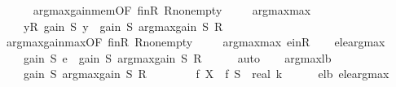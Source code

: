 \begin{isabellebody}
\ \ \ \ \isamarkupfalse%
\ argmax{\isacharunderscore}{\kern0pt}gain{\isacharunderscore}{\kern0pt}mem{\isacharbrackleft}{\kern0pt}OF\ finR\ R{\isacharunderscore}{\kern0pt}nonempty{\isacharprime}{\kern0pt}{\isacharbrackright}{\kern0pt}\ \isakeywordONE{{\isachardot}{\kern0pt}}\isamarkupfalse%
\isanewline
\isanewline
\ \ \isamarkupfalse%
\ argmax{\isacharunderscore}{\kern0pt}max{\isacharcolon}{\kern0pt}\isanewline
\ \ \ \ {\isachardoublequoteopen}{\isasymforall}y{\isasymin}{\isacharquery}{\kern0pt}R{\isachardot}{\kern0pt}\ gain\ {\isacharquery}{\kern0pt}S\ y\ {\isasymle}\ gain\ {\isacharquery}{\kern0pt}S\ {\isacharparenleft}{\kern0pt}argmax{\isacharunderscore}{\kern0pt}gain\ {\isacharquery}{\kern0pt}S\ {\isacharquery}{\kern0pt}R{\isacharparenright}{\kern0pt}{\isachardoublequoteclose}\isanewline
\ \ \ \ \isamarkupfalse%
\ argmax{\isacharunderscore}{\kern0pt}gain{\isacharunderscore}{\kern0pt}max{\isacharbrackleft}{\kern0pt}OF\ finR\ R{\isacharunderscore}{\kern0pt}nonempty{\isacharprime}{\kern0pt}{\isacharbrackright}{\kern0pt}\ \isakeywordONE{{\isachardot}{\kern0pt}}\isamarkupfalse%
\isanewline
\isanewline
\ \ \isamarkupfalse%
\ argmax{\isacharunderscore}{\kern0pt}max\ e{\isacharunderscore}{\kern0pt}inR\isanewline
\ \ \isamarkupfalse%
\ e{\isacharunderscore}{\kern0pt}le{\isacharunderscore}{\kern0pt}argmax{\isacharcolon}{\kern0pt}\isanewline
\ \ \ \ {\isachardoublequoteopen}gain\ {\isacharquery}{\kern0pt}S\ e\ {\isasymle}\ gain\ {\isacharquery}{\kern0pt}S\ {\isacharparenleft}{\kern0pt}argmax{\isacharunderscore}{\kern0pt}gain\ {\isacharquery}{\kern0pt}S\ {\isacharquery}{\kern0pt}R{\isacharparenright}{\kern0pt}{\isachardoublequoteclose}\isanewline
\ \ \ \ \isamarkupfalse%
\ auto\isanewline
\isanewline
\ \ \isamarkupfalse%
\ argmax{\isacharunderscore}{\kern0pt}lb{\isacharcolon}{\kern0pt}\isanewline
\ \ \ \ {\isachardoublequoteopen}gain\ {\isacharquery}{\kern0pt}S\ {\isacharparenleft}{\kern0pt}argmax{\isacharunderscore}{\kern0pt}gain\ {\isacharquery}{\kern0pt}S\ {\isacharquery}{\kern0pt}R{\isacharparenright}{\kern0pt}\isanewline
\ \ \ \ \ \ \ {\isasymge}\ {\isacharparenleft}{\kern0pt}f\ X\ {\isacharminus}{\kern0pt}\ f\ {\isacharquery}{\kern0pt}S{\isacharparenright}{\kern0pt}\ {\isacharslash}{\kern0pt}\ real\ k{\isachardoublequoteclose}\isanewline
\ \ \ \ \isamarkupfalse%
\ e{\isacharunderscore}{\kern0pt}lb\ e{\isacharunderscore}{\kern0pt}le{\isacharunderscore}{\kern0pt}argmax\ \isamarkupfalse%

\end{isabellebody}
